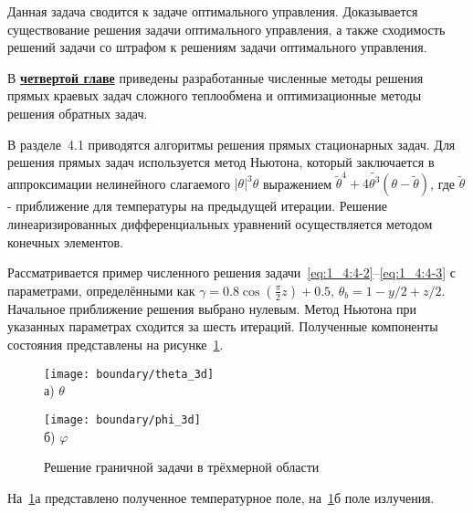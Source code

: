 Данная задача сводится к задаче оптимального управления.
Доказывается существование решения задачи оптимального управления, а также
сходимость решений задачи со штрафом к решениям задачи оптимального управления.


В \underline{\textbf{четвертой главе}} приведены разработанные численные методы решения
прямых краевых задач сложного теплообмена и оптимизационные методы решения обратных задач.


В разделе~4.1 приводятся алгоритмы решения прямых стационарных задач.
Для решения прямых задач используется метод Ньютона, который заключается в аппроксимации
нелинейного слагаемого $|\theta|^3 \theta$
выражением $\widetilde{\theta}^4+4 \widetilde{\theta^3}(\theta-\widetilde{\theta})$,
где $\widetilde{\theta}$ - приближение для температуры на предыдущей итерации.
Решение линеаризированных дифференциальных уравнений осуществляется методом
конечных элементов.


Рассматривается пример численного решения задачи~\eqref{eq:1_4:4-2}--\eqref {eq:1_4:4-3}
с параметрами, определёнными как
$\gamma = 0.8 \cos\left(\frac{\pi}{2} z\right) + 0.5$,
$\theta_b = 1- y / 2 + z /2$.
Начальное приближение решения выбрано нулевым.
Метод Ньютона при указанных параметрах сходится за шесть итераций.
Полученные компоненты состояния представлены на рисунке~\ref{fig:4_1:boundary_3d}.
\begin{figure}[h!t]
    \begin{minipage}[b][][b]{0.49\linewidth}
        \centering
        \texttt{[image: boundary/theta\_3d]} \\ а) $\theta$
    \end{minipage}
    \hfill
    \begin{minipage}[b][][b]{0.49\linewidth}
        \centering
        \texttt{[image: boundary/phi\_3d]} \\ б) $\varphi$
    \end{minipage}
    \caption{Решение граничной задачи в трёхмерной области}
    \label{fig:4_1:boundary_3d}
\end{figure}
На~\ref{fig:4_1:boundary_3d}а представлено полученное температурное поле,
на~\ref{fig:4_1:boundary_3d}б поле излучения.


